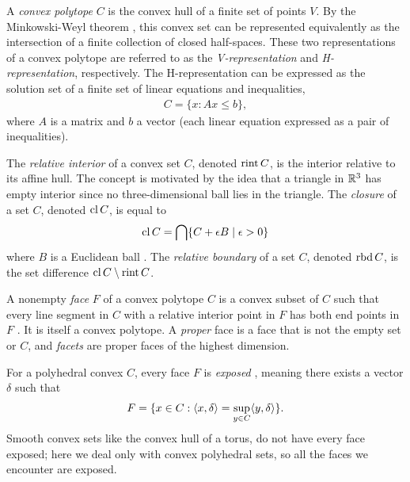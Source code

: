 A \emph{convex polytope} $C$ is the convex hull of a finite set of points $V$.
By the Minkowski-Weyl theorem \citep[Theorem 19.1]{Rockafellar:1970}, this convex 
set can be represented equivalently as the intersection of a finite collection of 
closed half-spaces.  These two representations of a convex polytope are referred to 
as the \emph{V-representation} and \emph{H-representation}, respectively.  
The H-representation can be expressed as the solution set of a finite set of linear 
equations and inequalities,
\begin{align*}
	C = \{x: Ax \leq b \},
\end{align*}
where $A$ is a matrix and $b$ a vector (each linear equation expressed as a pair of inequalities).

The \emph{relative interior} of a convex set $C$, denoted $\operatorname{rint} C$, is the interior 
relative to its affine hull.  The concept is motivated by the idea that a triangle
in ${\mathbb R}^3$ has empty interior 
since no three-dimensional ball lies in the triangle.  The \emph{closure} of a set $C$, denoted $\operatorname{cl} C$, is equal to
\begin{align*}
	\operatorname{cl} C = \bigcap \{C + \epsilon B \mid \epsilon > 0 \}
\end{align*}
where $B$ is a Euclidean ball \citep[Section 6]{Rockafellar:1970}.  The \emph{relative boundary} of a set $C$, denoted $\operatorname{rbd} C$, is the set difference $\operatorname{cl} C \setminus \operatorname{rint} C$.

A nonempty \emph{face} $F$ of a convex polytope $C$ is a convex subset of $C$ such that 
every line segment in $C$ with a relative interior point in $F$ has 
both end points in $F$ \citep[Section 18]{Rockafellar:1970}.  It is itself a convex polytope.
A \emph{proper} face is a face that is not the empty set or $C$, and 
\emph{facets} are proper faces of the highest dimension.

For a polyhedral convex $C$, every face $F$ is \emph{exposed} \citep[Section 18]{Rockafellar:1970}, 
meaning there exists a vector $\delta$ such that
\begin{align*}
	F = \{ x \in C: \langle x, \delta \rangle = \sup_{y \in C} \langle y,\delta \rangle  \}.
\end{align*}
Smooth convex sets like the convex hull of a torus, do not have every face
exposed; here we deal only with convex polyhedral sets, so all the faces we
encounter are exposed.


